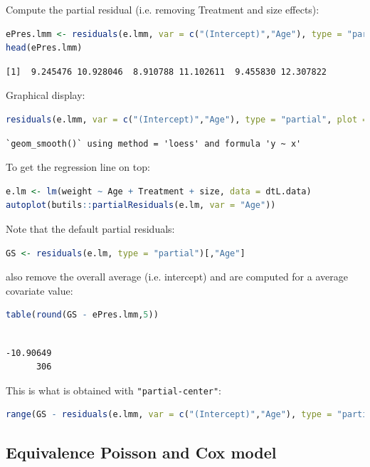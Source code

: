 \documentclass{article}
\begin{document}
Compute the partial residual (i.e. removing Treatment and size effects):
\begin{lstlisting}[language=r,numbers=none]
ePres.lmm <- residuals(e.lmm, var = c("(Intercept)","Age"), type = "partial")
head(ePres.lmm)
\end{lstlisting}

\label{}
\begin{verbatim}
[1]  9.245476 10.928046  8.910788 11.102611  9.455830 12.307822
\end{verbatim}


Graphical display:
\begin{lstlisting}[language=r,numbers=none]
residuals(e.lmm, var = c("(Intercept)","Age"), type = "partial", plot = "scatterplot")
\end{lstlisting}

\label{}
\begin{verbatim}
`geom_smooth()` using method = 'loess' and formula 'y ~ x'
\end{verbatim}


To get the regression line on top:
\begin{lstlisting}[language=r,numbers=none]
e.lm <- lm(weight ~ Age + Treatment + size, data = dtL.data)
autoplot(butils::partialResiduals(e.lm, var = "Age"))
\end{lstlisting}

Note that the default partial residuals:
\begin{lstlisting}[language=r,numbers=none]
GS <- residuals(e.lm, type = "partial")[,"Age"]
\end{lstlisting}

also remove the overall average (i.e. intercept) and are computed for
a average covariate value:
\begin{lstlisting}[language=r,numbers=none]
table(round(GS - ePres.lmm,5))
\end{lstlisting}

\label{}
\begin{verbatim}

-10.90649 
      306
\end{verbatim}


This is what is obtained with \texttt{"partial-center"}:
\begin{lstlisting}[language=r,numbers=none]
range(GS - residuals(e.lmm, var = c("(Intercept)","Age"), type = "partial-center"))
\end{lstlisting}
\subsection{Equivalence Poisson and Cox model}
\label{sec:orgf97822e}
\end{document}
